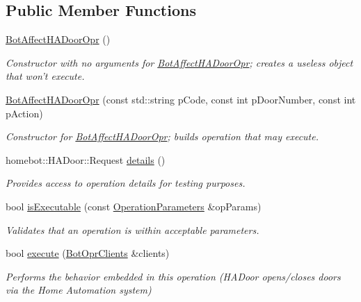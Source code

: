 \subsection*{Public Member Functions}
\begin{DoxyCompactItemize}
\item 
\hypertarget{classBotAffectHADoorOpr_a385c1a210b4fc2af8772af1082200c44}{\hyperlink{classBotAffectHADoorOpr_a385c1a210b4fc2af8772af1082200c44}{Bot\-Affect\-H\-A\-Door\-Opr} ()}\label{classBotAffectHADoorOpr_a385c1a210b4fc2af8772af1082200c44}

\begin{DoxyCompactList}\small\item\em Constructor with no arguments for \hyperlink{classBotAffectHADoorOpr}{Bot\-Affect\-H\-A\-Door\-Opr}; creates a useless object that won't execute. \end{DoxyCompactList}\item 
\hyperlink{classBotAffectHADoorOpr_aaf986c676dad29e1c151df36e42f3fc3}{Bot\-Affect\-H\-A\-Door\-Opr} (const std\-::string p\-Code, const int p\-Door\-Number, const int p\-Action)
\begin{DoxyCompactList}\small\item\em Constructor for \hyperlink{classBotAffectHADoorOpr}{Bot\-Affect\-H\-A\-Door\-Opr}; builds operation that may execute. \end{DoxyCompactList}\item 
homebot\-::\-H\-A\-Door\-::\-Request \hyperlink{classBotAffectHADoorOpr_a25eed68370708f33963cb962b8e23580}{details} ()
\begin{DoxyCompactList}\small\item\em Provides access to operation details for testing purposes. \end{DoxyCompactList}\item 
bool \hyperlink{classBotAffectHADoorOpr_a6a82af8cbb0f8c48abbc04dc3f63811b}{is\-Executable} (const \hyperlink{classOperationParameters}{Operation\-Parameters} \&op\-Params)
\begin{DoxyCompactList}\small\item\em Validates that an operation is within acceptable parameters. \end{DoxyCompactList}\item 
bool \hyperlink{classBotAffectHADoorOpr_ae6ea9d64ffdb7f2c5622500109a545b7}{execute} (\hyperlink{classBotOprClients}{Bot\-Opr\-Clients} \&clients)
\begin{DoxyCompactList}\small\item\em Performs the behavior embedded in this operation (H\-A\-Door opens/closes doors via the Home Automation system) \end{DoxyCompactList}\end{DoxyCompactItemize}
